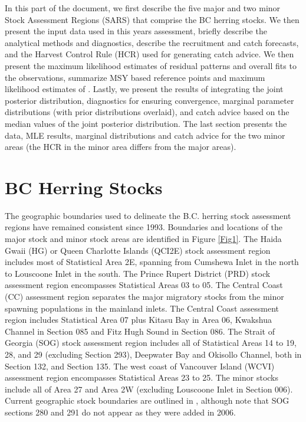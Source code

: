 In this part of the document, we first describe the five major and two minor Stock Assessment Regions (SARS) that comprise the BC herring stocks. We then present the input data used in this years assessment, briefly describe the analytical methods and diagnostics, describe the recruitment and catch forecasts, and the Harvest Control Rule (HCR) used for generating catch advice. We then present the maximum likelihood estimates of residual patterns and overall fits to the observations, summarize MSY based reference points and maximum likelihood estimates of \bo. Lastly, we present the results of integrating the joint posterior distribution, diagnostics for ensuring convergence, marginal parameter distributions (with prior distributions overlaid), and catch advice based on the median values of the joint posterior distribution.  The last section presents the data, MLE results, marginal distributions and catch advice for the two minor areas (the HCR in the minor area differs from the major areas).


\section{BC Herring Stocks}
The geographic boundaries used to delineate the B.C. herring stock assessment regions have remained consistent since 1993.  Boundaries and locations of the major stock and minor stock areas are identified in Figure \ref{Fig1}.  The Haida Gwaii (HG) or Queen Charlotte Islands (QCI2E) stock assessment region includes most of Statistical Area 2E, spanning from Cumshewa Inlet in the north to Louscoone Inlet in the south.  The Prince Rupert District (PRD) stock assessment region encompasses Statistical Areas 03 to 05.  The Central Coast (CC) assessment region separates the major migratory stocks from the minor spawning populations in the mainland inlets.  The Central Coast assessment region includes Statistical Area 07 plus Kitasu Bay in Area 06, Kwakshua Channel in Section 085 and Fitz Hugh Sound in Section 086.  The Strait of Georgia (SOG) stock assessment region includes all of Statistical Areas 14 to 19, 28, and 29 (excluding Section 293), Deepwater Bay and Okisollo Channel, both in Section 132, and Section 135.  The west coast of Vancouver Island (WCVI) assessment region encompasses Statistical Areas 23 to 25.  The minor stocks include all of Area 27 and Area 2W (excluding Louscoone Inlet in Section 006).  Current geographic stock boundaries are outlined in \cite{Midgley:2003fk}, although note that SOG sections 280 and 291 do not appear as they were added in 2006.

